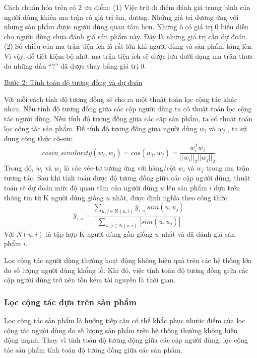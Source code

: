Cách chuẩn hóa trên có 2 ưu điểm: (1) Việc trừ đi điểm đánh giá trung bình của người dùng khiến ma trận có giá trị âm, dương. Những giá trị dương ứng với những sản phẩm được người dùng quan tâm
hơn. Những ô có giá trị 0 biểu diễn cho người dùng chưa đánh giá sản phẩm này. Đây là những giá trị cần dự đoán. (2) Số chiều của ma trận tiện ích là rất lớn khi người dùng và sản phẩm tăng lên. Vì vậy, để tiết kiệm bộ nhớ, ma trận tiện ích sẽ được lưu dưới dạng ma trận thưa do những dấu “?” đã được thay bằng giá trị 0.

\underline{Bước 2: Tính toán độ tương đồng và dự đoán}

Với mỗi cách tính độ tương đồng sẽ cho ra một thuật toán lọc cộng tác khác nhau.
Nếu tính độ tương đồng giữa các cặp người dùng ta có thuật toán lọc cộng tác người
dùng. Nếu tính độ tương đồng giữa các cặp sản phẩm, ta có thuật toán lọc cộng tác sản
phẩm. Để tính độ tương đồng giữa người dùng $w_i$ và $w_j$ , ta sử dụng công thức cô-sin:
\begin{equation}
    cosin\_similarity(w_i, w_j) = cos(w_i, w_j)=\frac{w_i^T w_j}{||w_i||_2||w_j||_2}
\end{equation}
Trong đó, $w_i$ và $w_j$ là các véc-tơ tương ứng với hàng/cột $w_i$ và $w_j$ trong ma trận tương tác. Sau khi tính toán được độ tương đồng giữa các cặp người dùng, thuật toán sẽ dự đoán
mức độ quan tâm của người dùng $u$ lên sản phẩm $i$ dựa trên thông tin từ K người dùng
giống $u$ nhất, được định nghĩa theo công thức:
\begin{equation}
    \hat{y}_{i,u}=\frac{\sum_{u, j \in \mathrm{N}(u,i)} \bar{y}_{i, u_j}sim(u, u_j)}{\sum_{u, j \in \mathrm{N}(u,i)}|sim(u,u_j)|}
\end{equation}
Với $N(u,i)$ là tập hợp K người dùng gần giống $u$ nhất và đã đánh giá sản phẩm $i$.

Lọc cộng tác người dùng thường hoạt động không hiệu quả trên các hệ thống lớn do số lượng người dùng khổng lồ. Khi đó, việc tính toán độ tương đồng giữa các cặp người dùng trở nên tốn kém tài nguyên là thời gian.

\subsubsection{Lọc cộng tác dựa trên sản phẩm}
Lọc cộng tác sản phẩm là hướng tiếp cận có thể khắc phục nhược điểm của lọc cộng tác người dùng do số lượng sản phẩm trên hệ thống thường không biến động mạnh. Thay vì tính toán độ tương động giữa các cặp người dùng, lọc cộng tác sản phẩm tính toán độ tương đồng giữa các sản phẩm.

